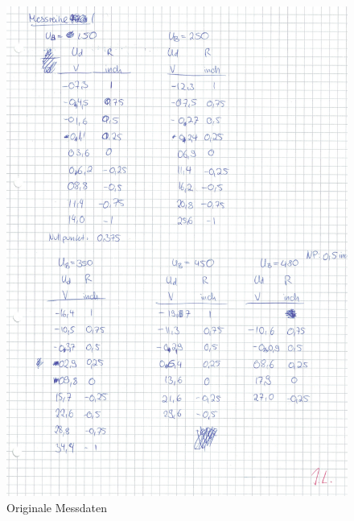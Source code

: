 \begin{figure}
  \centering
  \includegraphics[width=\textwidth]{OMD3.pdf}
  \caption{Originale Messdaten}
  \label{OMD3}
\end{figure}

\newpage



